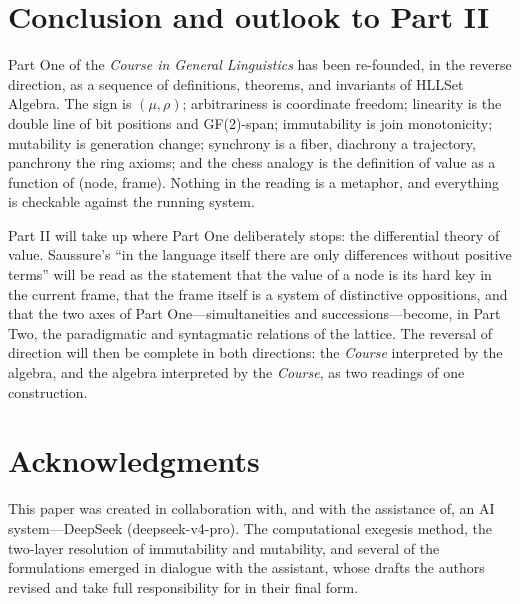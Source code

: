 \documentclass[11pt,a4paper]{article}
\theoremstyle{remark}
\newcommand{\Ing}{\ensuremath{\mu}}                      %
\newcommand{\Mat}{\ensuremath{\rho}}                     %
\begin{document}
\section{Conclusion and outlook to Part II}
\label{sec:conclusion}

Part One of the \textit{Course in General Linguistics} has been re-founded, in
the reverse direction, as a sequence of definitions, theorems, and invariants
of HLLSet Algebra. The sign is $(\Ing,\Mat)$; arbitrariness is coordinate
freedom; linearity is the double line of bit positions and GF(2)-span;
immutability is join monotonicity; mutability is generation change; synchrony
is a fiber, diachrony a trajectory, panchrony the ring axioms; and the chess
analogy is the definition of value as a function of (node, frame). Nothing in
the reading is a metaphor, and everything is checkable against the running
system.

Part II will take up where Part One deliberately stops: the differential theory
of value. Saussure's ``in the language itself there are only differences
without positive terms'' will be read as the statement that the value of a
node is its hard key in the current frame, that the frame itself is a system of
distinctive oppositions, and that the two axes of Part One---simultaneities and
successions---become, in Part Two, the paradigmatic and syntagmatic relations
of the lattice. The reversal of direction will then be complete in both
directions: the \textit{Course} interpreted by the algebra, and the algebra
interpreted by the \textit{Course}, as two readings of one construction.

\section*{Acknowledgments}
This paper was created in collaboration with, and with the assistance of, an
AI system---DeepSeek (deepseek-v4-pro). The computational exegesis method, the
two-layer resolution of immutability and mutability, and several of the
formulations emerged in dialogue with the assistant, whose drafts the authors
revised and take full responsibility for in their final form.
\end{document}
